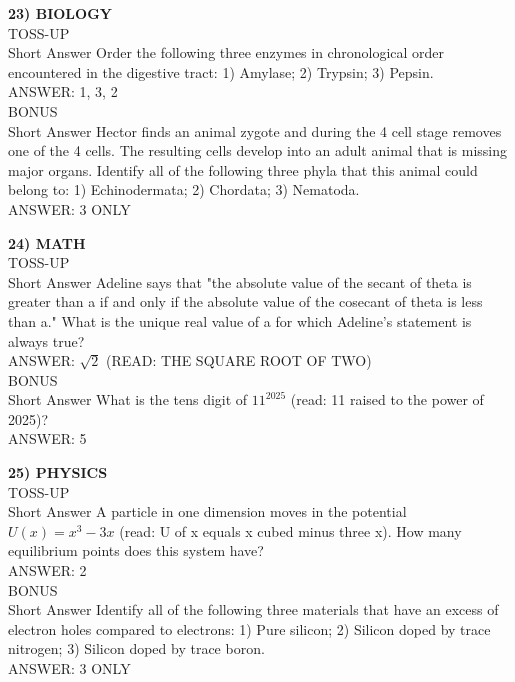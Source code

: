 \documentclass{article}
\begin{document}
\noindent \textbf{23) BIOLOGY} \\
TOSS-UP \\
Short Answer Order the following three enzymes in chronological order encountered in the digestive tract: 1) Amylase; 2) Trypsin; 3) Pepsin. \\
ANSWER: 1, 3, 2 \\
BONUS \\
Short Answer Hector finds an animal zygote and during the 4 cell stage removes one of the 4 cells. The resulting cells develop into an adult animal that is missing major organs. Identify all of the following three phyla that this animal could belong to: 1) Echinodermata; 2) Chordata; 3) Nematoda. \\
ANSWER: 3 ONLY

\noindent \textbf{24) MATH} \\
TOSS-UP \\
Short Answer Adeline says that "the absolute value of the secant of theta is greater than a if and only if the absolute value of the cosecant of theta is less than a." What is the unique real value of a for which Adeline's statement is always true? \\
ANSWER: $\sqrt{2}$ (READ: THE SQUARE ROOT OF TWO) \\
BONUS \\
Short Answer What is the tens digit of $11^{2025}$ (read: 11 raised to the power of 2025)? \\
ANSWER: 5

\noindent \textbf{25) PHYSICS} \\
TOSS-UP \\
Short Answer A particle in one dimension moves in the potential $U(x)=x^{3}-3x$ (read: U of x equals x cubed minus three x). How many equilibrium points does this system have? \\
ANSWER: 2 \\
BONUS \\
Short Answer Identify all of the following three materials that have an excess of electron holes compared to electrons: 1) Pure silicon; 2) Silicon doped by trace nitrogen; 3) Silicon doped by trace boron. \\
ANSWER: 3 ONLY
\end{document}
